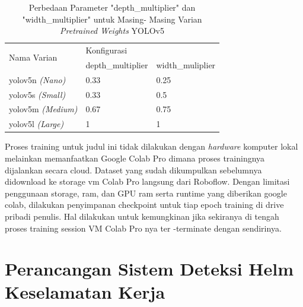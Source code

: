 \begin{longtable}{|l|l|l|} 
  \caption{Perbedaan Parameter "depth\_multiplier" dan "width\_multiplier" untuk Masing- Masing Varian \emph{Pretrained Weights} YOLOv5}
  \label{tb:perbedaanpretrainedyolov5}\\
  \hline
  \multirow{2}{*}{Nama Varian} & \multicolumn{2}{l|}{Konfigurasi}      \\ 
  \cline{2-3}
                               & depth\_multiplier & width\_muliplier  \\ 
  \hline
  yolov5n\textit{ (Nano)}      & 0.33              & 0.25              \\
  yolov5s\textit{ (Small)}     & 0.33              & 0.5               \\
  yolov5m\textit{ (Medium)}    & 0.67              & 0.75              \\
  yolov5l\textit{ (Large)}     & 1                 & 1                 \\
  \hline
\end{longtable}

\par Proses training untuk judul ini tidak dilakukan dengan \emph{hardware} komputer 
lokal melainkan memanfaatkan Google Colab Pro dimana proses trainingnya dijalankan secara cloud. 
Dataset yang sudah dikumpulkan sebelumnya didownload ke storage vm Colab Pro langsung dari 
Roboflow.  Dengan limitasi penggunaan storage, ram, dan GPU ram serta runtime 
yang diberikan google colab, dilakukan penyimpanan checkpoint untuk tiap epoch 
training di drive pribadi penulis. Hal dilakukan untuk kemungkinan jika 
sekiranya di tengah proses training session VM Colab Pro nya ter -terminate dengan sendirinya. 


\section{Perancangan Sistem Deteksi Helm Keselamatan Kerja}
\label{sec:perancangansistem}

